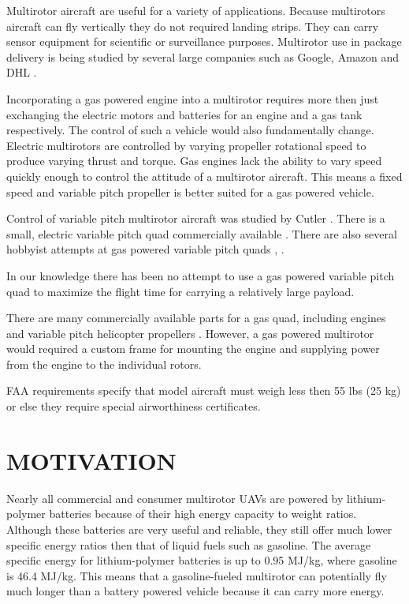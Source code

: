 \documentclass[letterpaper, 10 pt, conference]{ieeeconf}  %
\begin{document}
Multirotor aircraft are useful for a variety of applications.  Because multirotors aircraft can fly vertically they do not required landing strips.  They can carry sensor equipment for scientific or surveillance purposes. Multirotor use in package delivery is being studied by several large companies such as Google, Amazon and DHL \cite{Amazon2014}.   

Incorporating a gas powered engine into a multirotor requires more then just exchanging the electric motors and batteries for an engine and a gas tank respectively. The control of such a vehicle would also fundamentally change.  Electric multirotors are controlled by varying propeller rotational speed to produce varying thrust and torque. Gas engines lack the ability to vary speed quickly enough to control the attitude of a multirotor aircraft. This means a fixed speed and variable pitch propeller is better suited for a gas powered vehicle.

Control of variable pitch multirotor aircraft was studied by Cutler \cite{Cutler2012}. There is a small, electric variable pitch quad commercially available \cite{stingray2016}.  There are also several hobbyist attempts at gas powered variable pitch quads \cite{diy2016}, \cite{hackaday2016}.

In our knowledge there has been no attempt to use a gas powered variable pitch quad to maximize the flight time for carrying a relatively large payload. 

There are many commercially available parts for a gas quad, including engines \cite{da2016} and variable pitch helicopter propellers \cite{align2016}. However, a gas powered multirotor would required a custom frame for mounting the engine and supplying power from the engine to the individual rotors.

FAA requirements \cite{faa2016} specify that model aircraft must weigh less then 55 lbs (25 kg) or else they require special airworthiness certificates.

\section{MOTIVATION}

Nearly all commercial and consumer multirotor UAVs are powered by lithium-polymer batteries because of their high energy capacity to weight ratios. Although these batteries are very useful and reliable, they still offer much lower specific energy ratios then that of liquid fuels such as gasoline. The average specific energy for lithium-polymer batteries is up to 0.95 MJ/kg, where gasoline is 46.4 MJ/kg. This means that a gasoline-fueled multirotor can potentially fly much longer than a battery powered vehicle because it can carry more energy.  
\end{document}
